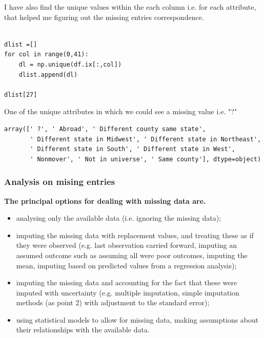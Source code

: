 \documentclass[10pt,a4paper]{article}
\begin{document}
I have also find the unique values within the each column i.e. for each attribute, that helped me figuring out the missing entries correspondence.

\lstset{%
basicstyle=\small, %
identifierstyle=, %
stringstyle=\ttfamily, %
showstringspaces=false} %

\lstset{language=Python}          %

\begin{lstlisting}[label=census-data,caption=missing values]  % Start your code-block

dlist =[]
for col in range(0,41):
    dl = np.unique(df.ix[:,col])
    dlist.append(dl)
    
dlist[27]    
\end{lstlisting}

One of the unique attributes in which we could see a missing value i.e. "?"
\begin{verbatim}
array([' ?', ' Abroad', ' Different county same state',
       ' Different state in Midwest', ' Different state in Northeast',
       ' Different state in South', ' Different state in West',
       ' Nonmover', ' Not in universe', ' Same county'], dtype=object)
\end{verbatim}


\subsubsection{Analysis on mising entries}

\textbf{The principal options for dealing with missing data are.}
\begin{itemize}
\item analysing only the available data (i.e. ignoring the missing data);
\item imputing the missing data with replacement values, and treating these as if they were observed (e.g. last observation carried forward, imputing an assumed outcome such as assuming all were poor outcomes, imputing the mean, imputing based on predicted values from a regression analysis);
\item imputing the missing data and accounting for the fact that these were imputed with uncertainty (e.g. multiple imputation, simple imputation methods (as point 2) with adjustment to the standard error);
\item using statistical models to allow for missing data, making assumptions about their relationships with the available data.
\end{itemize}
\end{document}
